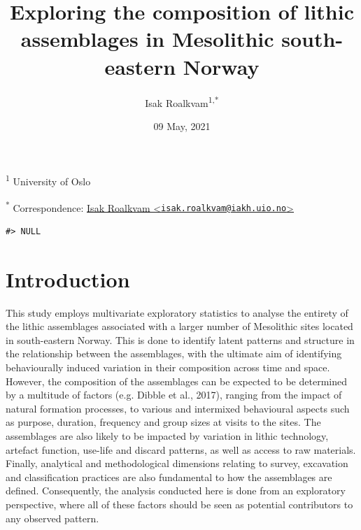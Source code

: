 \documentclass[
]{article}
\title{Exploring the composition of lithic assemblages in Mesolithic south-eastern Norway}
\author{Isak Roalkvam\textsuperscript{1,*}}
\date{09 May, 2021}
\begin{document}
\maketitle

{
\setcounter{tocdepth}{2}
\tableofcontents
}
\textsuperscript{1} University of Oslo

\textsuperscript{*} Correspondence: \href{mailto:isak.roalkvam@iakh.uio.no}{Isak Roalkvam \textless{}\href{mailto:isak.roalkvam@iakh.uio.no}{\nolinkurl{isak.roalkvam@iakh.uio.no}}\textgreater{}}

\begin{verbatim}
#> NULL
\end{verbatim}

\hypertarget{introduction}{%
\section{Introduction}\label{introduction}}

This study employs multivariate exploratory statistics to analyse the entirety of the lithic assemblages associated with a larger number of Mesolithic sites located in south-eastern Norway. This is done to identify latent patterns and structure in the relationship between the assemblages, with the ultimate aim of identifying behaviourally induced variation in their composition across time and space. However, the composition of the assemblages can be expected to be determined by a multitude of factors (e.g. Dibble et al., 2017), ranging from the impact of natural formation processes, to various and intermixed behavioural aspects such as purpose, duration, frequency and group sizes at visits to the sites. The assemblages are also likely to be impacted by variation in lithic technology, artefact function, use-life and discard patterns, as well as access to raw materials. Finally, analytical and methodological dimensions relating to survey, excavation and classification practices are also fundamental to how the assemblages are defined. Consequently, the analysis conducted here is done from an exploratory perspective, where all of these factors should be seen as potential contributors to any observed pattern.
\end{document}
